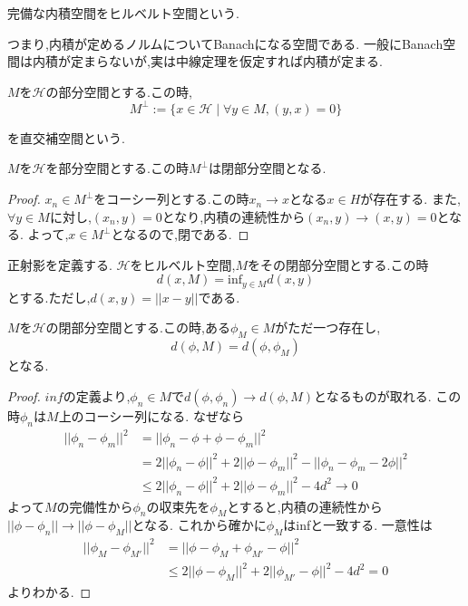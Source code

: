 \documentclass[uplatex]{jsbook}
\begin{document}
\begin{screen}
\begin{dfn}
 完備な内積空間をヒルベルト空間という.
\end{dfn}
\end{screen}
つまり,内積が定めるノルムについてBanachになる空間である. 一般にBanach空間は内積が定まらないが,実は中線定理を仮定すれば内積が定まる.

\begin{screen}
\begin{dfn}
  $M$を$\mathcal{H}$の部分空間とする.この時,
  \begin{equation*}
  M^{\perp}:= \{x \in \mathcal{H} \mid \forall y \in M, (y, x) = 0\}
  \end{equation*}
\end{dfn}
を直交補空間という.
\end{screen}

\begin{lem}
 $M$を$\mathcal{H}$を部分空間とする.この時$M^{\perp}$は閉部分空間となる.
\end{lem}
\begin{proof}
  $x_n \in M^{\perp}$をコーシー列とする.この時$x_n \to x$となる$x \in H$が存在する.
  また,$\forall y \in M$に対し,$(x_n, y) =0$となり,内積の連続性から$(x_n, y) \to (x, y) =0$となる.
  よって,$x \in M^{\perp}$となるので,閉である.
\end{proof}

正射影を定義する.
$\mathcal{H}$をヒルベルト空間,$M$をその閉部分空間とする.この時
\begin{equation*}
d(x, M) = \mathrm{inf}_{y\in M}d(x,y)
\end{equation*}
とする.ただし,$d(x,y) = ||x -y||$である.

\begin{prop}
 $M$を$\mathcal{H}$の閉部分空間とする.この時,ある$\phi_M \in M$がただ一つ存在し,
 \begin{equation*}
  d(\phi, M) = d(\phi, \phi_M)
 \end{equation*}
となる.
\end{prop}
\begin{proof}
$inf$の定義より,$\phi_n \in M$で$d(\phi, \phi_n) \to d(\phi, M)$となるものが取れる.
この時$\phi_n$は$M$上のコーシー列になる.
なぜなら
\begin{align*}
||\phi_n - \phi_m||^2 & = ||\phi_n - \phi + \phi - \phi_m ||^2 \\
                      & = 2||\phi_n - \phi||^2 + 2 ||\phi - \phi_m||^2 - ||\phi_n - \phi_m - 2\phi||^2 \\
                      & \le 2||\phi_n - \phi||^2 + 2 ||\phi - \phi_m||^2 - 4d^2  \to 0
\end{align*}
よって$M$の完備性から$\phi_n$の収束先を$\phi_M$とすると,内積の連続性から$||\phi - \phi_n|| \to ||\phi - \phi_M ||$となる.
これから確かに$\phi_M$はinfと一致する.
一意性は
\begin{align*}
||\phi_M - \phi_{M'}||^2 & = ||\phi - \phi_M + \phi_{M'} - \phi ||^2 \\
                         & \le 2||\phi - \phi_M||^2 + 2 ||\phi_{M'} - \phi||^2 - 4d^2 = 0
\end{align*}
よりわかる.
\end{proof}
\end{document}
